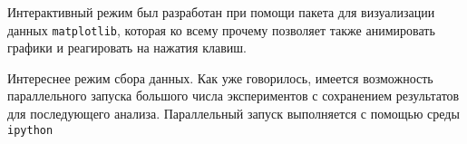 Интерактивный режим был разработан при помощи пакета для визуализации данных \texttt{matplotlib}, которая ко всему прочему позволяет также анимировать графики и реагировать на нажатия клавиш. 

Интереснее режим сбора данных. Как уже говорилось, имеется возможность параллельного запуска большого числа экспериментов с сохранением результатов для последующего анализа. Параллельный запуск выполняется с помощью среды \texttt{ipython}


\clearpage
